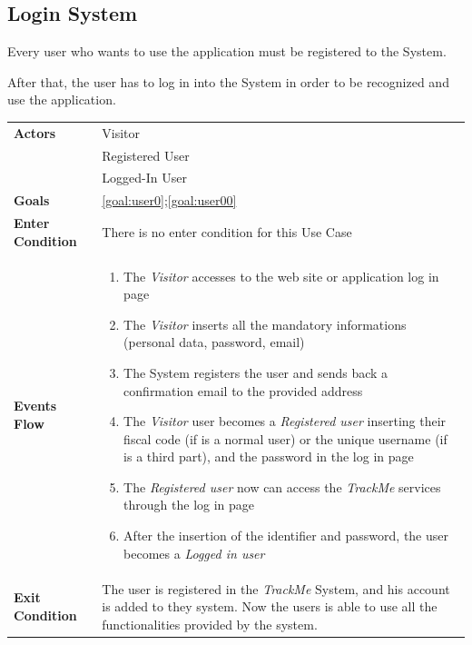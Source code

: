   \subsection{Login System}
Every user who wants to use the application must be registered to the System.



After that, the user has to log in into the System in order to be recognized and use the application.

\begin{table}[H]
	\centering
    
    \begin{tabular}{|p{3.5cm}|p{10.3cm}|}
    
    \hline
    \textbf{\large{Actors}}  			& \tabitem Visitor 									\\
    				 					& \tabitem Registered User							\\
                     					& \tabitem Logged-In User 							\\
    \hline
    \textbf{\large{Goals}} 				& \ref{goal:user0};\ref{goal:user00}\\
    
    \hline
    \textbf{\large{Enter Condition}}	& There is no enter condition for this Use Case		\\
    
    \hline
    \textbf{\large{Events Flow}}		& \begin{enumerate}[leftmargin=0.5cm]
                                          	\item The \emph{Visitor}  accesses to the web site or application log in page
                                            \item The \emph{Visitor} inserts all the mandatory informations (personal data, password, email)
                                            \item The System registers the user and sends back a confirmation email to the provided address
                                            \item The \emph{Visitor} user becomes a \emph{Registered user} inserting their fiscal code (if is a normal user) or the unique username (if is a third part), and the password in the log in page   
                                            \item The \emph{Registered user} now can access the \emph{TrackMe} services through the log in page
                                            
                                            \item After the insertion of the identifier and password, the user becomes a \emph{Logged in user}
                                          \end{enumerate}
    										\\
    \hline
    \textbf{\large{Exit Condition}} 	& The user is registered in the \emph{TrackMe} System, and his account is added to they system. Now the users is able to use all the functionalities provided by the system. \\
    

\end{tabular}
\end{table}
